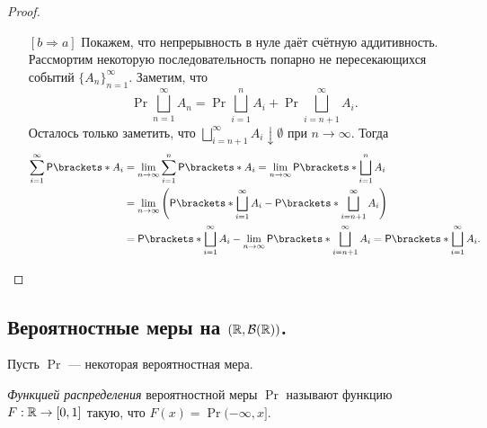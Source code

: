 \begin{proof}
\begin{itemize}
		\item[{\([b \Rightarrow a]\)}] Покажем, что непрерывность в нуле даёт счётную аддитивность. Рассмортим некоторую последовательность попарно не пересекающихся событий \(\{A_n\}_{n = 1}^{\infty}\). Заметим, что
		\[
		\Pr{\bigsqcup\limits_{n=1}^{\infty}A_n} =
		\Pr{\bigsqcup\limits_{i=1}^{n}A_i} +
		\Pr{\bigsqcup\limits_{i=n + 1}^{\infty} A_i}.
		\]
		Осталось только заметить, что \(\bigsqcup\limits_{i= n + 1}^{\infty} A_i \downarrow \emptyset\) при \(n \to \infty\). Тогда
		\begin{align}
			\sum\limits_{i = 1}^{\infty}\Pr{A_i} &=
			\lim\limits_{n\to\infty} \sum\limits_{i = 1}^{n}\Pr{A_i} =
			\lim\limits_{n\to\infty} \Pr{\bigsqcup\limits_{i = 1}^{n}A_i} \\
			&= \lim\limits_{n\to\infty} \left(
			\Pr{\bigsqcup\limits_{i = 1}^{\infty}A_i} -
			\Pr{\bigsqcup\limits_{i = n+1}^{\infty}A_i}
			\right) \\
			&= \Pr{\bigsqcup\limits_{i = 1}^{\infty}A_i} -
			\lim\limits_{n\to\infty} \Pr{\bigsqcup\limits_{i = n+1}^{\infty}A_i} =
			\Pr{\bigsqcup\limits_{i = 1}^{\infty}A_i}.\qedhere
		\end{align}
	\end{itemize}
\end{proof}


\subsection{Вероятностные меры на $\left( \mathbb{R}, \mathcal{B}(\mathbb{R}) \right)$.}
Пусть $\Pr$ --- некоторая вероятностная мера.

\begin{definition}
	\emph{Функцией распределения} вероятностной меры $\Pr$ называют функцию $F: \mathbb{R} \to [0, 1]$ такую, что
	$F(x) = \Pr{(-\infty, x]}$.
\end{definition}

